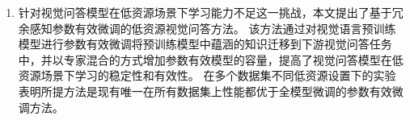 \begin{chineseabstract}
\begin{enumerate}[wide,]
\item 针对视觉问答模型在低资源场景下学习能力不足这一挑战，本文提出了基于冗余感知参数有效微调的低资源视觉问答方法。
该方法通过对视觉语言预训练模型进行参数有效微调将预训练模型中蕴涵的知识迁移到下游视觉问答任务中，并以专家混合的方式增加参数有效模型的容量，提高了视觉问答模型在低资源场景下学习的稳定性和有效性。
在多个数据集不同低资源设置下的实验表明所提方法是现有唯一在所有数据集上性能都优于全模型微调的参数有效微调方法。

\end{enumerate}


\end{chineseabstract}
